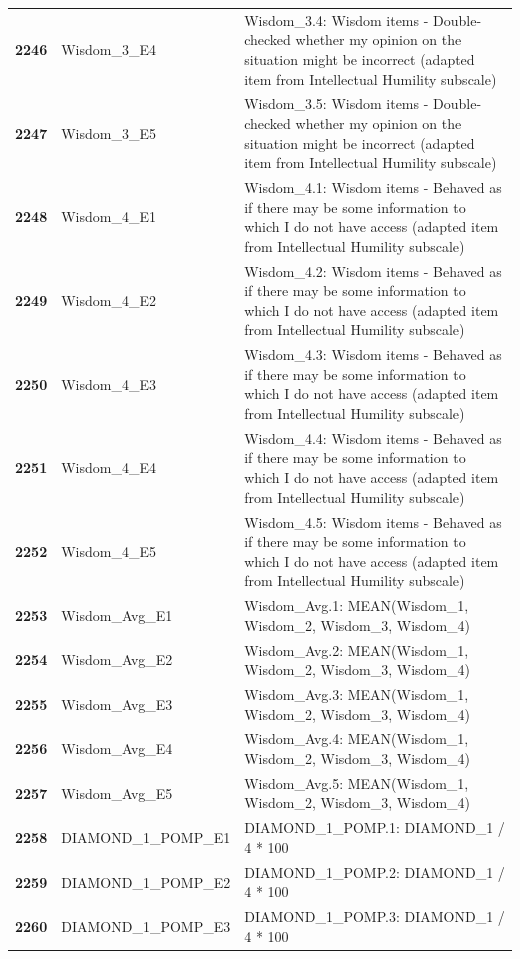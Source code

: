 \documentclass[
  letterpaper,
  DIV=11,
  numbers=noendperiod]{scrartcl}
\begin{document}
\begin{longtable}[t]{>{}cll}
\addlinespace
\textbf{2246} & Wisdom\_3\_E4 & Wisdom\_3.4: Wisdom items - Double-checked whether my opinion on the situation might be incorrect (adapted item from Intellectual Humility subscale)\\
\textbf{2247} & Wisdom\_3\_E5 & Wisdom\_3.5: Wisdom items - Double-checked whether my opinion on the situation might be incorrect (adapted item from Intellectual Humility subscale)\\
\textbf{2248} & Wisdom\_4\_E1 & Wisdom\_4.1: Wisdom items - Behaved as if there may be some information to which I do not have access (adapted item from Intellectual Humility subscale)\\
\textbf{2249} & Wisdom\_4\_E2 & Wisdom\_4.2: Wisdom items - Behaved as if there may be some information to which I do not have access (adapted item from Intellectual Humility subscale)\\
\textbf{2250} & Wisdom\_4\_E3 & Wisdom\_4.3: Wisdom items - Behaved as if there may be some information to which I do not have access (adapted item from Intellectual Humility subscale)\\
\addlinespace
\textbf{2251} & Wisdom\_4\_E4 & Wisdom\_4.4: Wisdom items - Behaved as if there may be some information to which I do not have access (adapted item from Intellectual Humility subscale)\\
\textbf{2252} & Wisdom\_4\_E5 & Wisdom\_4.5: Wisdom items - Behaved as if there may be some information to which I do not have access (adapted item from Intellectual Humility subscale)\\
\textbf{2253} & Wisdom\_Avg\_E1 & Wisdom\_Avg.1: MEAN(Wisdom\_1, Wisdom\_2, Wisdom\_3, Wisdom\_4)\\
\textbf{2254} & Wisdom\_Avg\_E2 & Wisdom\_Avg.2: MEAN(Wisdom\_1, Wisdom\_2, Wisdom\_3, Wisdom\_4)\\
\textbf{2255} & Wisdom\_Avg\_E3 & Wisdom\_Avg.3: MEAN(Wisdom\_1, Wisdom\_2, Wisdom\_3, Wisdom\_4)\\
\addlinespace
\textbf{2256} & Wisdom\_Avg\_E4 & Wisdom\_Avg.4: MEAN(Wisdom\_1, Wisdom\_2, Wisdom\_3, Wisdom\_4)\\
\textbf{2257} & Wisdom\_Avg\_E5 & Wisdom\_Avg.5: MEAN(Wisdom\_1, Wisdom\_2, Wisdom\_3, Wisdom\_4)\\
\textbf{2258} & DIAMOND\_1\_POMP\_E1 & DIAMOND\_1\_POMP.1: DIAMOND\_1 / 4 * 100\\
\textbf{2259} & DIAMOND\_1\_POMP\_E2 & DIAMOND\_1\_POMP.2: DIAMOND\_1 / 4 * 100\\
\textbf{2260} & DIAMOND\_1\_POMP\_E3 & DIAMOND\_1\_POMP.3: DIAMOND\_1 / 4 * 100\\

\end{longtable}
\end{document}
